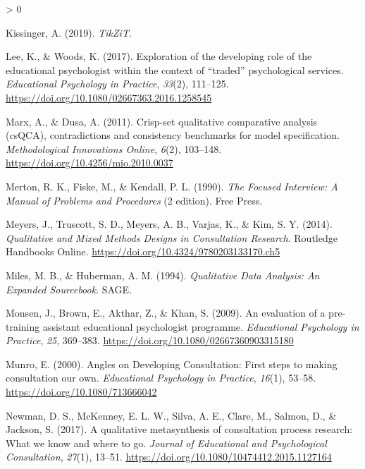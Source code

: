 \documentclass[
  english,
  man,floatsintext]{apa6}
\newlength{\cslhangindent}
\newenvironment{CSLReferences}[2] %
 {%
  \setlength{\parindent}{0pt}
  \ifodd #1 \everypar{\setlength{\hangindent}{\cslhangindent}}\ignorespaces\fi
  \ifnum #2 > 0
  \setlength{\parskip}{#2\baselineskip}
  \fi
 }%
 {}
\begin{document}
\begin{CSLReferences}{1}{0}
\leavevmode\hypertarget{ref-kissingerTikZiT2019}{}%
Kissinger, A. (2019). \emph{{TikZiT}}.

\leavevmode\hypertarget{ref-leeExplorationDevelopingRole2017}{}%
Lee, K., \& Woods, K. (2017). Exploration of the developing role of the educational psychologist within the context of {``traded''} psychological services. \emph{Educational Psychology in Practice}, \emph{33}(2), 111--125. \url{https://doi.org/10.1080/02667363.2016.1258545}

\leavevmode\hypertarget{ref-marxCrispSetQualitativeComparative2011}{}%
Marx, A., \& Dusa, A. (2011). Crisp-set qualitative comparative analysis (csQCA), contradictions and consistency benchmarks for model specification. \emph{Methodological Innovations Online}, \emph{6}(2), 103--148. \url{https://doi.org/10.4256/mio.2010.0037}

\leavevmode\hypertarget{ref-mertonFocusedInterviewManual1990}{}%
Merton, R. K., Fiske, M., \& Kendall, P. L. (1990). \emph{The {Focused Interview}: {A Manual} of {Problems} and {Procedures}} (2 edition). {Free Press}.

\leavevmode\hypertarget{ref-meyersQualitativeMixedMethods2014}{}%
Meyers, J., Truscott, S. D., Meyers, A. B., Varjas, K., \& Kim, S. Y. (2014). \emph{Qualitative and Mixed Methods Designs in Consultation Research}. Routledge Handbooks Online. \url{https://doi.org/10.4324/9780203133170.ch5}

\leavevmode\hypertarget{ref-milesQualitativeDataAnalysis1994}{}%
Miles, M. B., \& Huberman, A. M. (1994). \emph{Qualitative {Data Analysis}: {An Expanded Sourcebook}}. {SAGE}.

\leavevmode\hypertarget{ref-monsenEvaluationPreTraining2009}{}%
Monsen, J., Brown, E., Akthar, Z., \& Khan, S. (2009). An evaluation of a pre-training assistant educational psychologist programme. \emph{Educational Psychology in Practice}, \emph{25}, 369--383. \url{https://doi.org/10.1080/02667360903315180}

\leavevmode\hypertarget{ref-munroAnglesDevelopingConsultation2000}{}%
Munro, E. (2000). Angles on {Developing Consultation}: {First} steps to making consultation our own. \emph{Educational Psychology in Practice}, \emph{16}(1), 53--58. \url{https://doi.org/10.1080/713666042}

\leavevmode\hypertarget{ref-newmanQualitativeMetasynthesisConsultation2017}{}%
Newman, D. S., McKenney, E. L. W., Silva, A. E., Clare, M., Salmon, D., \& Jackson, S. (2017). A qualitative metasynthesis of consultation process research: What we know and where to go. \emph{Journal of Educational and Psychological Consultation}, \emph{27}(1), 13--51. \url{https://doi.org/10.1080/10474412.2015.1127164}


\end{CSLReferences}
\end{document}
